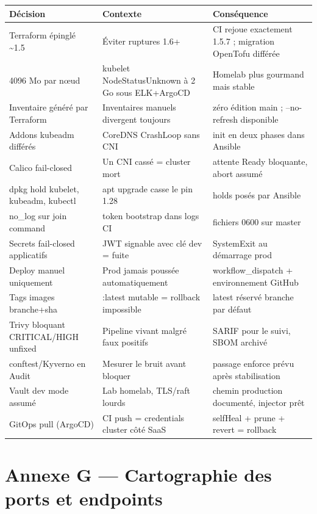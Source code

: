 \documentclass[12pt,a4paper]{article}
\begin{document}
\begin{longtable}{@{}p{4.2cm}p{5.6cm}p{4.2cm}@{}}
\toprule
\textbf{Décision} & \textbf{Contexte} & \textbf{Conséquence} \\
\midrule
\endhead
Terraform épinglé \textasciitilde1.5 & Éviter ruptures 1.6+ & CI rejoue exactement 1.5.7 ; migration OpenTofu différée \\
4096 Mo par nœud & kubelet NodeStatusUnknown à 2 Go sous ELK+ArgoCD & Homelab plus gourmand mais stable \\
Inventaire généré par Terraform & Inventaires manuels divergent toujours & zéro édition main ; --no-refresh disponible \\
Addons kubeadm différés & CoreDNS CrashLoop sans CNI & init en deux phases dans Ansible \\
Calico fail-closed & Un CNI cassé = cluster mort & attente Ready bloquante, abort assumé \\
dpkg hold kubelet, kubeadm, kubectl & apt upgrade casse le pin 1.28 & holds posés par Ansible \\
no\_log sur join command & token bootstrap dans logs CI & fichiers 0600 sur master \\
Secrets fail-closed applicatifs & JWT signable avec clé dev = fuite & SystemExit au démarrage prod \\
Deploy manuel uniquement & Prod jamais poussée automatiquement & workflow\_dispatch + environnement GitHub \\
Tags images branche+sha & :latest mutable = rollback impossible & latest réservé branche par défaut \\
Trivy bloquant CRITICAL/HIGH unfixed & Pipeline vivant malgré faux positifs & SARIF pour le suivi, SBOM archivé \\
conftest/Kyverno en Audit & Mesurer le bruit avant bloquer & passage enforce prévu après stabilisation \\
Vault dev mode assumé & Lab homelab, TLS/raft lourds & chemin production documenté, injector prêt \\
GitOps pull (ArgoCD) & CI push = credentials cluster côté SaaS & selfHeal + prune + revert = rollback \\
\bottomrule
\end{longtable}

\section*{Annexe G --- Cartographie des ports et endpoints}
\end{document}
